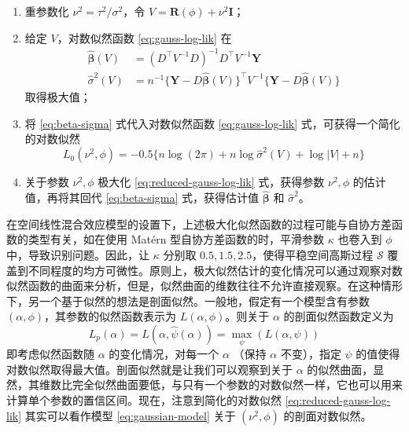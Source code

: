 \documentclass[12pt,a4paper,UTF8,twoside]{book}
\providecommand{\tightlist}{%
  \setlength{\itemsep}{0pt}\setlength{\parskip}{0pt}}
\begin{document}
\begin{enumerate}
\def\labelenumi{\arabic{enumi}.}
\tightlist
\item
  重参数化 \(\nu^2 = \tau^2/\sigma^2\)，令
  \(V = \mathbf{R}(\phi) + \nu^2 \mathbf{I}\)；
\item
  给定 \(V\)，对数似然函数 \eqref{eq:gauss-log-lik} 在 \begin{equation}
  \begin{aligned}
     \hat{\boldsymbol{\beta}}(V) & =  (D^{\top} V^{-1} D)^{-1} D^{\top} V^{-1}\mathbf{Y} \\
     \hat{\sigma}^2(V)           & =  n^{-1} \{\mathbf{Y} - D\hat{\boldsymbol{\beta}}(V)\}^{\top} V^{-1} \{\mathbf{Y} - D\hat{\boldsymbol{\beta}}(V)\}
  \end{aligned} \label{eq:beta-sigma}
  \end{equation} 取得极大值；
\item
  将 \eqref{eq:beta-sigma} 式代入对数似然函数 \eqref{eq:gauss-log-lik}
  式，可获得一个简化的对数似然 \begin{equation}
     L_{0}(\nu^2,\phi) = - 0.5\{ n\log(2\pi) + n\log \hat{\sigma}^2(V) + \log |V| + n \} \label{eq:reduced-gauss-log-lik}
  \end{equation}
\item
  关于参数 \(\nu^2, \phi\) 极大化 \eqref{eq:reduced-gauss-log-lik}
  式，获得参数 \(\nu^2, \phi\) 的估计值，再将其回代 \eqref{eq:beta-sigma}
  式，获得估计值 \(\hat{\boldsymbol{\beta}}\) 和 \(\hat{\sigma}^2\)。
\end{enumerate}

在空间线性混合效应模型的设置下，上述极大化似然函数的过程可能与自协方差函数的类型有关，如在使用
Matérn 型自协方差函数的时，平滑参数 \(\kappa\) 也卷入到 \(\phi\)
中，导致识别问题。因此，让 \(\kappa\) 分别取
\(0.5,1.5,2.5\)，使得平稳空间高斯过程 \(\mathcal{S}\)
覆盖到不同程度的均方可微性。原则上，极大似然估计的变化情况可以通过观察对数似然函数的曲面来分析，但是，似然曲面的维数往往不允许直接观察。在这种情形下，另一个基于似然的想法是剖面似然。一般地，假定有一个模型含有参数
\((\alpha,\phi)\)，其参数的似然函数表示为 \(L(\alpha,\phi)\)。则关于
\(\alpha\) 的剖面似然函数定义为 \begin{equation}
L_{p}(\alpha) = L(\alpha,\hat{\psi}(\alpha)) = \max_{\psi} (L(\alpha,\psi))
\label{eq:profile-log-lik}
\end{equation} \noindent 即考虑似然函数随 \(\alpha\)
的变化情况，对每一个 \(\alpha\) （保持 \(\alpha\) 不变），指定 \(\psi\)
的值使得对数似然取得最大值。剖面似然就是让我们可以观察到关于 \(\alpha\)
的似然曲面，显然，其维数比完全似然曲面要低，与只有一个参数的对数似然一样，它也可以用来计算单个参数的置信区间。现在，注意到简化的对数似然
\eqref{eq:reduced-gauss-log-lik} 其实可以看作模型 \eqref{eq:gaussian-model}
关于 \((\nu^2,\phi)\) 的剖面对数似然。
\end{document}
